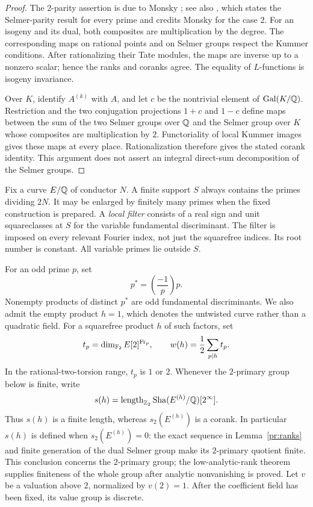 \begin{proof}
The $2$-parity assertion is due to Monsky \cite{Monsky1996};
see also \cite[Theorems~1.4 and~4.19]{DokchitserDokchitser2010},
which states the Selmer-parity result for every prime and credits
Monsky for the case $2$.
For an isogeny and its dual, both composites are multiplication by the
degree. The corresponding maps on rational points and on Selmer groups
respect the Kummer conditions. After rationalizing their Tate modules,
the maps are inverse up to a nonzero scalar; hence the ranks and coranks
agree. The equality of $L$-functions is isogeny invariance.

Over $K$, identify $A^{(k)}$ with $A$, and let $c$ be the nontrivial
element of $\operatorname{Gal}(K/\mathbb Q)$. Restriction and the two conjugation
projections $1+c$ and $1-c$ define maps between the sum of the two
Selmer groups over $\mathbb Q$ and the Selmer group over $K$ whose composites are
multiplication by $2$. Functoriality of local Kummer images gives these
maps at every place. Rationalization therefore gives the stated corank
identity. This argument does not assert an integral direct-sum
decomposition of the Selmer groups.
\end{proof}

Fix a curve $E/\mathbb Q$ of conductor $N$. A finite support $S$ always contains
the primes dividing $2N$. It may be enlarged by finitely many primes when
the fixed construction is prepared. A \emph{local filter} consists of a
real sign and unit squareclasses at $S$ for the variable fundamental
discriminant. The filter is imposed on every relevant Fourier index,
not just the squarefree indices. Its root number is constant.
All variable primes lie outside $S$.

For an odd prime $p$, set
\[
p^*=\left(\frac{-1}{p}\right)p.
\]
Nonempty products of distinct $p^*$ are odd fundamental discriminants.
We also admit the empty product $h=1$, which denotes the untwisted
curve rather than a quadratic field. For a squarefree product $h$ of
such factors, set
\[
 t_p=\dim_{\mathbb F_2} E[2]^{\operatorname{Fr}_p},
 \qquad
 w(h)=\frac12\sum_{p\mid h}t_p.
\]
In the rational-two-torsion range, $t_p$ is $1$ or $2$.
Whenever the $2$-primary group below is finite, write
\[
s(h)=\operatorname{length}_{\mathbb Z_2}\operatorname{Sha}(E^{(h)}/\mathbb Q)[2^\infty].
\]
Thus $s(h)$ is a finite length, whereas $s_2(E^{(h)})$ is a corank.
In particular $s(h)$ is defined when $s_2(E^{(h)})=0$: the exact
sequence in Lemma~\ref{pr:ranks} and finite generation of the dual
Selmer group make its $2$-primary quotient finite. This conclusion
concerns the $2$-primary group; the low-analytic-rank theorem supplies
finiteness of the whole group after analytic nonvanishing is proved.
Let $v$ be a valuation above $2$, normalized by $v(2)=1$.
After the coefficient field has been fixed, its value group is discrete.

